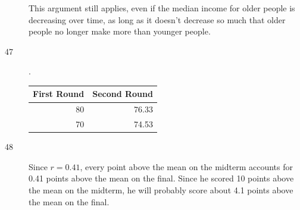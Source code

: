 \documentclass[letterpaper, landscape]{exam}
\begin{document}
\begin{description}
        This argument still applies, even if the median income for older people
        is decreasing over time, as long as it doesn't decrease so much that
        older people no longer make more than younger people.

      \item[47].
        \begin{table}[H]
          \centering
          \begin{tabular}{rr}
            \toprule
            First Round & Second Round \\
            \midrule
            80          & 76.33 \\
            70          & 74.53 \\
            \bottomrule
          \end{tabular}
        \end{table}

      \item[48]
        Since $r = 0.41$, every point above the mean on the midterm accounts for
        0.41 points above the mean on the final.  Since he scored 10 points
        above the mean on the midterm, he will probably score about 4.1 points
        above the mean on the final.






\end{description}
\end{document}
